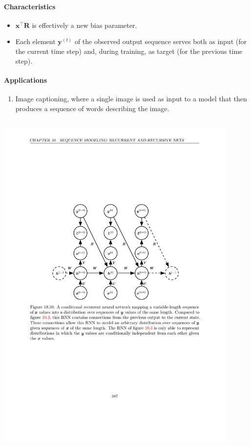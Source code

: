 \documentclass[12pt, a4paper]{article}
\def\vx{\boldsymbol{x}}
\def\vR{\boldsymbol{R}}
\newcommand{\egvy}[1]{\boldsymbol{y}^{(#1)}}
\begin{document}
\paragraph{Characteristics}
\begin{itemize}
    \item $\vx^\top \vR$ is effectively a new bias parameter.
    \item Each element $\egvy{t}$ of the observed output sequence serves both as input (for the current time step) and, during training, as target (for the previous time step).
\end{itemize}
\paragraph{Applications}
\begin{enumerate}
    \item Image captioning, where a single image is used as input to a model that then produces a sequence of words describing the image.
\end{enumerate}


\subsection{}
\begin{center}
    \includegraphics[width=0.9\textwidth]{../imgs/RNN_5.pdf}
\end{center}
\end{document}

